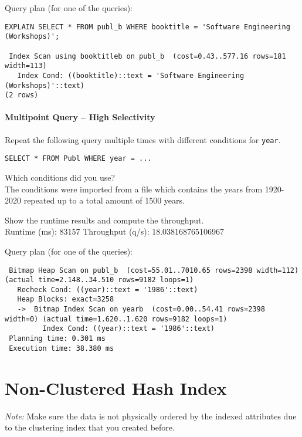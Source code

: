 \documentclass[11pt]{scrartcl}
\begin{document}
\smallskip\noindent
Query plan (for one of the queries):
\begin{verbatim}
EXPLAIN SELECT * FROM publ_b WHERE booktitle = 'Software Engineering (Workshops)';

 Index Scan using booktitleb on publ_b  (cost=0.43..577.16 rows=181 width=113)
   Index Cond: ((booktitle)::text = 'Software Engineering (Workshops)'::text)
(2 rows)
\end{verbatim}



\paragraph{Multipoint Query -- High Selectivity}

Repeat the following query multiple times with different conditions for {\tt year}.

{\small
\begin{verbatim}
SELECT * FROM Publ WHERE year = ...
\end{verbatim}
}

\noindent
Which conditions did you use?\\
The conditions were imported from a file which contains the years from 1920-2020 repeated up to a total amount of 1500 years.

\smallskip\noindent
Show the runtime results and compute the throughput.\\
Runtime (ms): 83157
Throughput (q/s): 18.038168765106967

\smallskip\noindent
Query plan (for one of the queries):
{\small
\begin{verbatim}
 Bitmap Heap Scan on publ_b  (cost=55.01..7010.65 rows=2398 width=112) (actual time=2.148..34.510 rows=9182 loops=1)
   Recheck Cond: ((year)::text = '1986'::text)
   Heap Blocks: exact=3258
   ->  Bitmap Index Scan on yearb  (cost=0.00..54.41 rows=2398 width=0) (actual time=1.620..1.620 rows=9182 loops=1)
         Index Cond: ((year)::text = '1986'::text)
 Planning time: 0.301 ms
 Execution time: 38.380 ms
\end{verbatim}
}

\section{Non-Clustered Hash Index}

\noindent \emph{Note:} Make sure the data is not physically ordered by
the indexed attributes due to the clustering index that you created
before.
\end{document}
